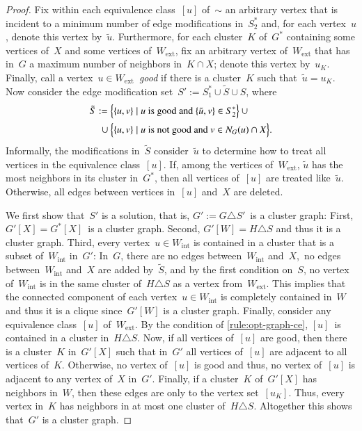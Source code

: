 \documentclass[envcountsame,numbook,smallextended]{svjour3}
\numberwithin{equation}{section}
\numberwithin{figure}{section}
\newcommand{\symdiff}{\triangle}
\newcommand{\Wext}{\ensuremath{W_\text{ext}}}
\newcommand{\Wint}{\ensuremath{W_\text{int}}}
\begin{document}
\begin{proof}
  Fix within each equivalence class~$[u]$ of~$\sim$ an
  arbitrary vertex that is incident to a minimum number of edge
  modifications in~$S^*_2$ and, for each vertex~$u$, denote this vertex
  by~$\tilde{u}$.
  Furthermore, for each cluster~$K$ of~$G^*$
  containing some vertices of~$X$ and some vertices
  of~$\Wext$, fix an arbitrary vertex of~$\Wext$ that has in~$G$ a maximum
  number of neighbors in~$K\cap X$; denote this vertex
  by~$u_K$. Finally, call a vertex~$u\in \Wext$~\emph{good} if there
  is a cluster~$K$ such that~$\tilde{u}=u_K$.
  Now consider the edge modification set~$S':=S_1^*\cup\tilde{S}\cup S$, where \begin{align*}
    \tilde{S}:={}&\Bigl\{\{u,v\}\mid \text{$u$ is~good and } \{\tilde{u},v\}\in S_2^*\Bigr\}\cup{}\\
{}\cup{}& \Bigl\{\{u,v\}\mid \text{$u$ is not good and } v\in N_G(u)\cap X\Bigr\}.
  \end{align*}
  Informally, the modifications in~$\tilde{S}$ consider~$\tilde{u}$ to
  determine how to treat all vertices in the equivalence
  class~$[u]$. If, among the vertices of~$\Wext$, $\tilde{u}$ has the most neighbors in its cluster
  in~$G^*$, then all vertices of~$[u]$ are treated
  like~$\tilde{u}$. Otherwise, all edges between vertices in~$[u]$
  and~$X$ are deleted.

  We first show that~$S'$ is a solution, that is, $G':=G\symdiff{} S'$~is a
  cluster graph: First, $G'[X]=G^*[X]$~is a cluster
  graph. Second, $G'[W]=H\symdiff{} S$ and thus it is a cluster
  graph. Third, every vertex~$u \in \Wint$ is contained in a cluster that is a subset of~$\Wint$ in~$G'$: In~$G$, there are no edges between~$\Wint$ and~$X$,~no edges between~$\Wint$ and~$X$ are added by~$\tilde{S}$, and by the first condition on~$S$, no vertex of~$\Wint$ is in the same cluster of~$H\symdiff S$ as a vertex from~$\Wext$. This implies that the connected component of each vertex~$u\in \Wint$ is completely contained in~$W$ and thus it is a clique since~$G'[W]$ is a cluster graph. Finally, consider any equivalence class~$[u]$ of~$\Wext$. By the
  condition of \cref{rule:opt-graph-ce}, $[u]$~is contained in a cluster in~$H\symdiff{} S$.
 Now, if all vertices of~$[u]$ are good, then there is a
  cluster~$K$ in~$G'[X]$ such that in~$G'$ all vertices of~$[u]$ are
  adjacent to all vertices of~$K$.
 Otherwise, no vertex of~$[u]$
  is good and thus, no vertex of~$[u]$ is adjacent to any
  vertex of~$X$ in~$G'$. Finally, if a cluster~$K$ of~$G'[X]$ has neighbors in~$W$, then these edges are only to the vertex
  set~$[u_K]$. Thus, every vertex in~$K$ has neighbors in at most
  one cluster of~$H\symdiff{} S$. Altogether this shows that~$G'$ is a
  cluster graph.


\end{proof}
\end{document}
